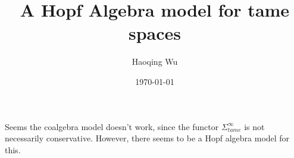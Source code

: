 \documentclass[a4paper, 11pt]{book}
\title{A Hopf Algebra model for tame spaces}
\author{Haoqing Wu}
\date{\today}
\begin{document}
\maketitle
% 

\tableofcontents






\appendix




Seems the coalgebra model doesn't work, since the functor $\Sigma^{\infty}_{tame}$ is not necessarily conservative.
However, there seems to be a Hopf algebra model for this.







\clearpage


\end{document}
